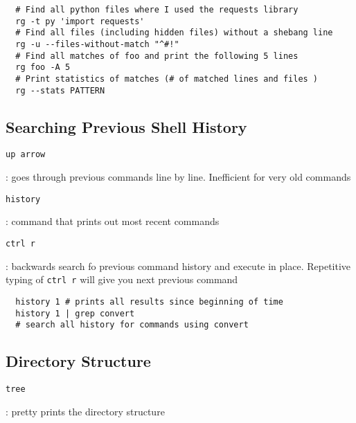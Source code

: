 \documentclass[letterpaper,12pt]{article}
\newcommand*{\lstitem}[1]{
  \setbox0\hbox{\lstinline{#1}}
  \item[\usebox0]
}
\begin{document}
\begin{lstlisting}
  # Find all python files where I used the requests library
  rg -t py 'import requests'
  # Find all files (including hidden files) without a shebang line
  rg -u --files-without-match "^#!"
  # Find all matches of foo and print the following 5 lines
  rg foo -A 5
  # Print statistics of matches (# of matched lines and files )
  rg --stats PATTERN
\end{lstlisting}

\subsection{Searching Previous Shell History}

\begin{description}
 \lstitem{up arrow}: goes through previous commands line by line. Inefficient for very old commands
 \lstitem{history}: command that prints out most recent commands
 \lstitem{ctrl r}: backwards search fo previous command history and execute in place. Repetitive typing of \lstinline{ctrl r}  will give you next previous command
\end{description}

\begin{lstlisting}
  history 1 # prints all results since beginning of time
  history 1 | grep convert
  # search all history for commands using convert
\end{lstlisting}


\subsection{Directory Structure}
\begin{description}
 \lstitem{tree}: pretty prints the directory structure
\end{description}
\end{document}
